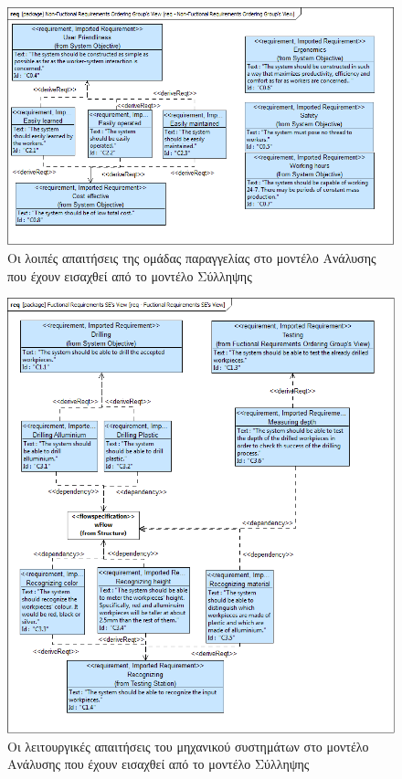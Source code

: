 \documentclass[a4paper,12pt,twoside]{report}
\begin{document}
{\begin{appendices}
			\begin{figure}[hp]
					\centering
					\includegraphics[scale=0.45]{AnalysisModel_req-Non-FuctionalRequirementsOrderingGroupsView.png}
					\caption{Οι λοιπές απαιτήσεις της ομάδας παραγγελίας στο μοντέλο Ανάλυσης που έχουν εισαχθεί από το μοντέλο Σύλληψης}
				\label{φωτ:Οι λοιπές απαιτήσεις της ομάδας παραγγελίας στο μοντέλο Ανάλυσης που έχουν εισαχθεί από το μοντέλο Σύλληψης}
			\end{figure}
				
			\begin{figure}[hp]
					\centering
					\includegraphics[scale=0.45]{AnalysisModel_req-FuctionalRequirementsSEsView.png}
					\caption{Οι λειτουργικές απαιτήσεις του μηχανικού συστημάτων στο μοντέλο Ανάλυσης που έχουν εισαχθεί από το μοντέλο Σύλληψης}
					\label{φωτ:Οι λειτουργικές απαιτήσεις του μηχανικού συστημάτων στο μοντέλο Ανάλυσης που έχουν εισαχθεί από το μοντέλο Σύλληψης}
			\end{figure}
				

\end{appendices}}
\end{document}
